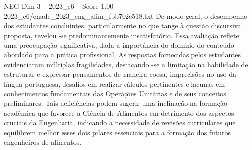 \begin{textsample}{NEG Dim 3 – 2023\_c6 – Score 1.00 – 2023\_c6/enade\_2023\_eng\_alim\_fbb702e518.txt}
De modo geral, o desempenho dos estudantes concluintes, particularmente no que tange à questão discursiva proposta, revelou -se predominantemente insatisfatório.
Essa avaliação reflete uma preocupação significativa, dada a importância do domínio do conteúdo abordado para a prática profissional.
As respostas fornecidas pelos estudantes evidenciaram múltiplas fragilidades, destacando -se a limitação na habilidade de estruturar e expressar pensamentos de maneira coesa, imprecisões no uso da língua portuguesa, desafios em realizar cálculos pertinentes e lacunas em conhecimentos fundamentais das Operações Unitárias e de seus conceitos preliminares.
Tais deficiências podem sugerir uma inclinação na formação acadêmica que favorece a Ciência de Alimentos em detrimento dos aspectos cruciais da Engenharia, indicando a necessidade de revisões curriculares que equilibrem melhor esses dois pilares essenciais para a formação dos futuros engenheiros de alimentos.

\end{textsample}
